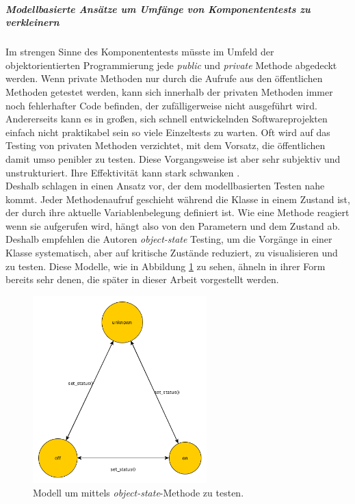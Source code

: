 \subparagraph{Modellbasierte Ansätze um Umfänge von Komponententests zu verkleinern}
Im strengen Sinne des Komponententests müsste im Umfeld der objektorientierten Programmierung jede \textit{public} und \textit{private} Methode abgedeckt werden. Wenn private Methoden nur durch die Aufrufe aus den öffentlichen Methoden getestet werden, kann sich innerhalb der privaten Methoden immer noch fehlerhafter Code befinden, der zufälligerweise nicht ausgeführt wird. Andererseits kann es in großen, sich schnell entwickelnden Softwareprojekten einfach nicht praktikabel sein so viele Einzeltests zu warten. Oft wird auf das Testing von privaten Methoden verzichtet, mit dem Vorsatz, die öffentlichen damit umso penibler zu testen. Diese Vorgangsweise ist aber sehr subjektiv und unstrukturiert. Ihre Effektivität kann stark schwanken \cite{linz_testing_2014}.\\
Deshalb schlagen \citeauthor{linz_testing_2014} in \cite{linz_testing_2014} einen Ansatz vor, der dem modellbasierten Testen nahe kommt. Jeder Methodenaufruf geschieht während die Klasse in einem Zustand ist, der durch ihre aktuelle Variablenbelegung definiert ist. Wie eine Methode reagiert wenn sie aufgerufen wird, hängt also von den Parametern und dem Zustand ab. Deshalb empfehlen die Autoren \textit{object-state} Testing, um die Vorgänge in einer Klasse systematisch, aber auf kritische Zustände reduziert, zu visualisieren und zu testen. Diese Modelle, wie in Abbildung \ref{fig:mbt_unit} zu sehen, ähneln in ihrer Form bereits sehr denen, die später in dieser Arbeit vorgestellt werden.

\begin{figure}[h] 
  \centering
     \includegraphics[width=0.6\textwidth]{figures/mbt_unit.png}
  \caption{Modell um mittels \textit{object-state}-Methode zu testen.}
  \label{fig:mbt_unit}
\end{figure}


